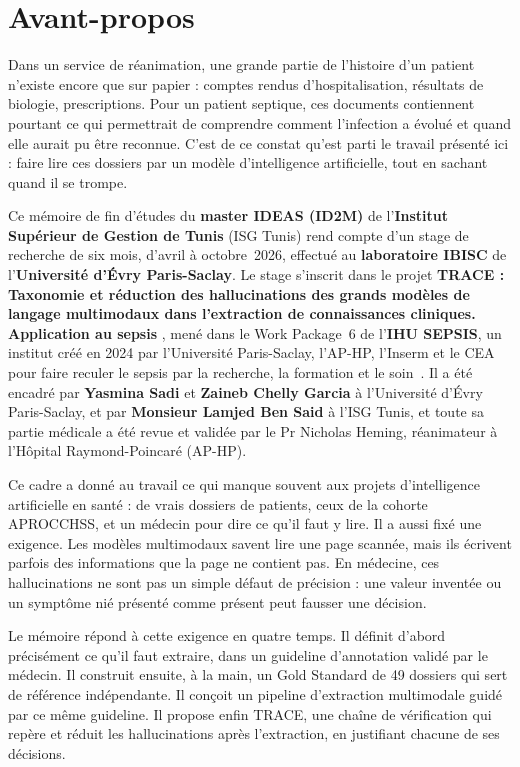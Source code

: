 \chapter*{Avant-propos}

Dans un service de réanimation, une grande partie de l'histoire d'un patient n'existe encore que sur papier : comptes rendus d'hospitalisation, résultats de biologie, prescriptions. Pour un patient septique, ces documents contiennent pourtant ce qui permettrait de comprendre comment l'infection a évolué et quand elle aurait pu être reconnue. C'est de ce constat qu'est parti le travail présenté ici : faire lire ces dossiers par un modèle d'intelligence artificielle, tout en sachant quand il se trompe.

Ce mémoire de fin d'études du \textbf{master IDEAS (ID2M)} de l'\textbf{Institut Supérieur de Gestion de Tunis} (ISG Tunis) rend compte d'un stage de recherche de six mois, d'avril à octobre~2026, effectué au \textbf{laboratoire IBISC} de l'\textbf{Université d'Évry Paris-Saclay}. Le stage s'inscrit dans le projet \og \textbf{TRACE : Taxonomie et réduction des hallucinations des grands modèles de langage multimodaux dans l'extraction de connaissances cliniques. Application au sepsis} \fg{}, mené dans le Work Package~6 de l'\textbf{IHU SEPSIS}, un institut créé en 2024 par l'Université Paris-Saclay, l'AP-HP, l'Inserm et le CEA pour faire reculer le sepsis par la recherche, la formation et le soin~\cite{ihu_lancement}. Il a été encadré par \textbf{Yasmina Sadi} et \textbf{Zaineb Chelly Garcia} à l'Université d'Évry Paris-Saclay, et par \textbf{Monsieur Lamjed Ben Said} à l'ISG Tunis, et toute sa partie médicale a été revue et validée par le Pr Nicholas Heming, réanimateur à l'Hôpital Raymond-Poincaré (AP-HP).

Ce cadre a donné au travail ce qui manque souvent aux projets d'intelligence artificielle en santé : de vrais dossiers de patients, ceux de la cohorte APROCCHSS, et un médecin pour dire ce qu'il faut y lire. Il a aussi fixé une exigence. Les modèles multimodaux savent lire une page scannée, mais ils écrivent parfois des informations que la page ne contient pas. En médecine, ces hallucinations ne sont pas un simple défaut de précision : une valeur inventée ou un symptôme nié présenté comme présent peut fausser une décision.

Le mémoire répond à cette exigence en quatre temps. Il définit d'abord précisément ce qu'il faut extraire, dans un guideline d'annotation validé par le médecin. Il construit ensuite, à la main, un Gold Standard de 49 dossiers qui sert de référence indépendante. Il conçoit un pipeline d'extraction multimodale guidé par ce même guideline. Il propose enfin TRACE, une chaîne de vérification qui repère et réduit les hallucinations après l'extraction, en justifiant chacune de ses décisions.

